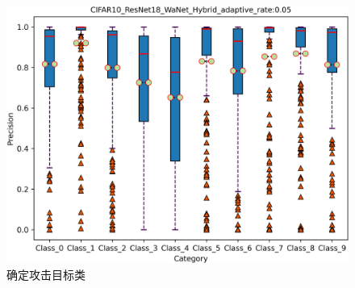 \documentclass[fontset=macnew,UTF8]{article} %
\begin{document}
\begin{figure}[t]
{\begin{minipage}[b]{.3\linewidth}
			\includegraphics[scale=0.28]{./Backdoor_detect_result/target_class/WaNet.png}
		\end{minipage}
	}
	\caption{确定攻击目标类}
	\label{target_class}
\end{figure}
\end{document}
